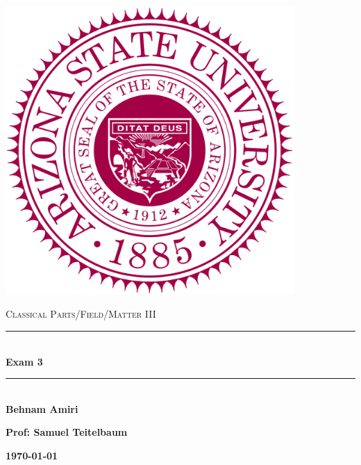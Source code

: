 \documentclass[fleqn]{article}
\begin{document}
  \begin{titlepage}

    \newcommand{\HRule}{\rule{\linewidth}{0.5mm}}

    \center

    \begin{center}
      \includegraphics[height=11cm, width=11cm]{asu.png}
    \end{center}

    \vline

    \textsc{\LARGE Classical Parts/Field/Matter III}\\[1.5cm]

    \HRule \\[0.5cm]
    { \huge \bfseries Exam 3}\\[0.4cm] 
    \HRule \\[1.0cm]

    \textbf{Behnam Amiri}

    \bigbreak

    \textbf{Prof: Samuel Teitelbaum}

    \bigbreak

    \textbf{{\large \today}\\[2cm]}

    \vfill

  \end{titlepage}
\end{document}
